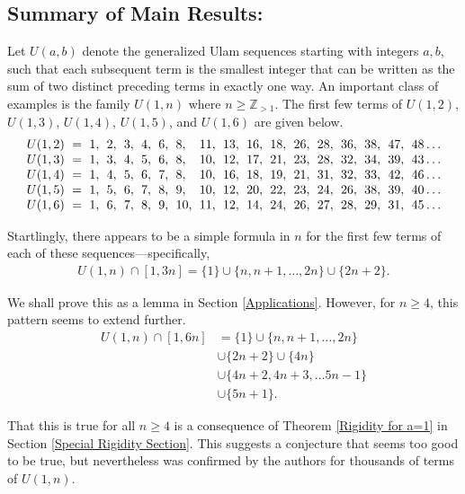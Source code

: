 \documentclass{amsart}
\newcommand{\ZZ}{\mathbb{Z}}
\theoremstyle{theorem}
\theoremstyle{definition}
\begin{document}
\subsection{Summary of Main Results:}
Let $U(a,b)$ denote the generalized Ulam sequences starting with integers $a,b$, such that each subsequent term is the smallest integer that can be written as the sum of two distinct preceding terms in exactly one way. An important class of examples is the family $U(1,n)$ where $n \geq \ZZ_{>1}$. The first few terms of $U(1,2)$, $U(1,3)$, $U(1,4)$, $U(1,5)$, and $U(1,6)$ are given below.
\begin{align*}
\arraycolsep=3pt
    \begin{array}{llllllllllllllllll}
    U(1,2) & = & 1, & 2, & 3, & 4, & 6, & 8, & 11, & 13, & 16, & 18, & 26, & 28, & 36, & 38, & 47, & 48 \ldots \\
    U(1,3) & = & 1, & 3, & 4, & 5, & 6, & 8, & 10, & 12, & 17, & 21, & 23, & 28, & 32, & 34, & 39, & 43 \ldots \\
    U(1,4) & = & 1, & 4, & 5, & 6, & 7, & 8, & 10, & 16, & 18, & 19, & 21, & 31, & 32, & 33, & 42, & 46 \ldots \\
    U(1,5) & = & 1, & 5, & 6, & 7, & 8, & 9, & 10, & 12, & 20, & 22, & 23, & 24, & 26, & 38, & 39, & 40 \ldots \\
    U(1,6) & = & 1, & 6, & 7, & 8, & 9, & 10, & 11, & 12, & 14, & 24, & 26, & 27, & 28, & 29, & 31, & 45 \ldots
    \end{array}
\end{align*}    
    
\noindent Startlingly, there appears to be a simple formula in $n$ for the first few terms of each of these sequences---specifically,
	\begin{align*}
    U(1,n) \cap [1,3n] = \{1\} \cup \{n, n + 1, \ldots, 2n\} \cup \{2n + 2\}.
    \end{align*}
    
\noindent We shall prove this as a lemma in Section \ref{Applications}. However, for $n \geq 4$, this pattern seems to extend further.
	\begin{align*}
    U(1,n) \cap [1,6n] &= \{1\} \cup \{n, n + 1, \ldots, 2n\} \\
    &\cup \{2n + 2\} \cup \{4n\} \\
    &\cup \{4n + 2, 4n + 3, \ldots 5n - 1\} \\
    &\cup \{5n + 1\}.
    \end{align*}
    
\noindent That this is true for all $n \geq 4$ is a consequence of Theorem \ref{Rigidity for a=1} in Section \ref{Special Rigidity Section}. This suggests a conjecture that seems too good to be true, but nevertheless was confirmed by the authors for thousands of terms of $U(1,n)$.
\end{document}
